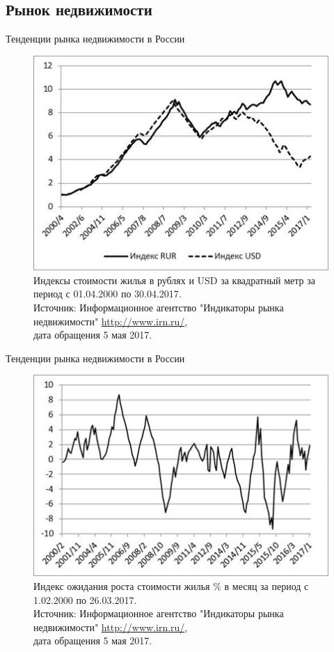 \documentclass[_Banking_p2.tex]{subfiles}
\begin{document}
\subsection{Рынок недвижимости}
\begin{frame}[shrink=15]{Тенденции рынка недвижимости в России}
\begin{figure}
\center
\includegraphics[scale=.8]{img/real_estate_price_index.png}
\caption{Индексы стоимости жилья в рублях и USD за квадратный метр за период с 01.04.2000 по 30.04.2017. \\
Источник: Информационное агентство "Индикаторы рынка недвижимости"  \url{http://www.irn.ru/},\\ дата обращения 5 мая 2017.}
\end{figure}
\end{frame}

\begin{frame}[shrink=15]{Тенденции рынка недвижимости в России}
\begin{figure}
\center
\includegraphics[scale=.8]{img/real_estate_price_expectations.png}
\caption{Индекс ожидания роста стоимости жилья \% в месяц за период с 1.02.2000 по 26.03.2017.\\
Источник: Информационное агентство "Индикаторы рынка недвижимости"  \url{http://www.irn.ru/},\\ дата обращения 5 мая 2017.}
\end{figure}
\end{frame}
\end{document}
